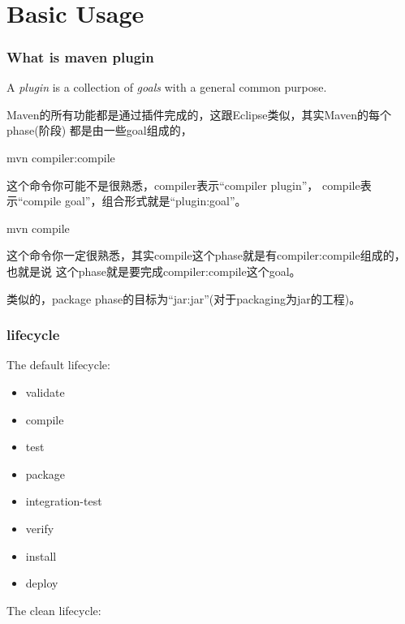 \documentclass[a4paper,11pt]{article}
\begin{document}
\tt %
\pagestyle{header}
\sybmaketitle
\tableofcontents
\newpage

\pagestyle{main}
\setcounter{page}{1}

\part[Basic Usage]{Basic Usage}
\section[What is maven plugin]{What is maven plugin}
A \emph{plugin} is a collection of \emph{goals} with a general common purpose.\label{sec:plugin}

Maven的所有功能都是通过插件完成的，这跟Eclipse类似，其实Maven的每个phase(阶段)
都是由一些goal组成的，

\begin{bashcode}
  mvn compiler:compile
\end{bashcode}

这个命令你可能不是很熟悉，compiler表示“compiler plugin”，
compile表示“compile goal”，组合形式就是“plugin:goal”。

\begin{bashcode}
  mvn compile
\end{bashcode}

这个命令你一定很熟悉，其实compile这个phase就是有compiler:compile组成的，也就是说
这个phase就是要完成compiler:compile这个goal。

类似的，package phase的目标为“jar:jar”(对于packaging为jar的工程)。

\section[lifecycle]{lifecycle}
The default lifecycle:

\begin{itemize}
\item validate
\item compile
\item test
\item package
\item integration-test
\item verify
\item install
\item deploy
\end{itemize}

The clean lifecycle:
\end{document}
